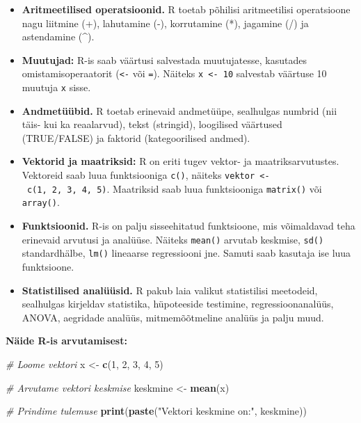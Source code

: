 \documentclass[
]{book}
\newenvironment{Shaded}{\begin{snugshade}}{\end{snugshade}}
\newcommand{\CommentTok}[1]{\textcolor[rgb]{0.56,0.35,0.01}{\textit{#1}}}
\newcommand{\DecValTok}[1]{\textcolor[rgb]{0.00,0.00,0.81}{#1}}
\newcommand{\FunctionTok}[1]{\textcolor[rgb]{0.13,0.29,0.53}{\textbf{#1}}}
\newcommand{\NormalTok}[1]{#1}
\newcommand{\OtherTok}[1]{\textcolor[rgb]{0.56,0.35,0.01}{#1}}
\newcommand{\StringTok}[1]{\textcolor[rgb]{0.31,0.60,0.02}{#1}}
\providecommand{\tightlist}{%
  \setlength{\itemsep}{0pt}\setlength{\parskip}{0pt}}
\renewenvironment{Shaded} {\begin{snugshade}\footnotesize} {\end{snugshade}}
\begin{document}
\begin{itemize}
\tightlist
\item
  \textbf{Aritmeetilised operatsioonid.} R toetab põhilisi aritmeetilisi operatsioone nagu liitmine (+), lahutamine (-), korrutamine (*), jagamine (/) ja astendamine (\^{}).
\item
  \textbf{Muutujad:} R-is saab väärtusi salvestada muutujatesse, kasutades omistamisoperaatorit (\texttt{\textless{}-} või \texttt{=}). Näiteks \texttt{x\ \textless{}-\ 10} salvestab väärtuse 10 muutuja \texttt{x} sisse.
\item
  \textbf{Andmetüübid.} R toetab erinevaid andmetüüpe, sealhulgas numbrid (nii täis- kui ka reaalarvud), tekst (stringid), loogilised väärtused (TRUE/FALSE) ja faktorid (kategoorilised andmed).
\item
  \textbf{Vektorid ja maatriksid:} R on eriti tugev vektor- ja maatriksarvutustes. Vektoreid saab luua funktsiooniga \texttt{c()}, näiteks \texttt{vektor\ \textless{}-\ c(1,\ 2,\ 3,\ 4,\ 5)}. Maatriksid saab luua funktsiooniga \texttt{matrix()} või \texttt{array()}.
\item
  \textbf{Funktsioonid.} R-is on palju sisseehitatud funktsioone, mis võimaldavad teha erinevaid arvutusi ja analüüse. Näiteks \texttt{mean()} arvutab keskmise, \texttt{sd()} standardhälbe, \texttt{lm()} lineaarse regressiooni jne. Samuti saab kasutaja ise luua funktsioone.
\item
  \textbf{Statistilised analüüsid.} R pakub laia valikut statistilisi meetodeid, sealhulgas kirjeldav statistika, hüpoteeside testimine, regressioonanalüüs, ANOVA, aegridade analüüs, mitmemõõtmeline analüüs ja palju muud.
\end{itemize}

\textbf{Näide R-is arvutamisest:}

\begin{Shaded}
\begin{Highlighting}[]
\CommentTok{\# Loome vektori}
\NormalTok{x }\OtherTok{\textless{}{-}} \FunctionTok{c}\NormalTok{(}\DecValTok{1}\NormalTok{, }\DecValTok{2}\NormalTok{, }\DecValTok{3}\NormalTok{, }\DecValTok{4}\NormalTok{, }\DecValTok{5}\NormalTok{)}

\CommentTok{\# Arvutame vektori keskmise}
\NormalTok{keskmine }\OtherTok{\textless{}{-}} \FunctionTok{mean}\NormalTok{(x)}

\CommentTok{\# Prindime tulemuse}
\FunctionTok{print}\NormalTok{(}\FunctionTok{paste}\NormalTok{(}\StringTok{"Vektori keskmine on:"}\NormalTok{, keskmine))}
\end{Highlighting}
\end{Shaded}
\end{document}
